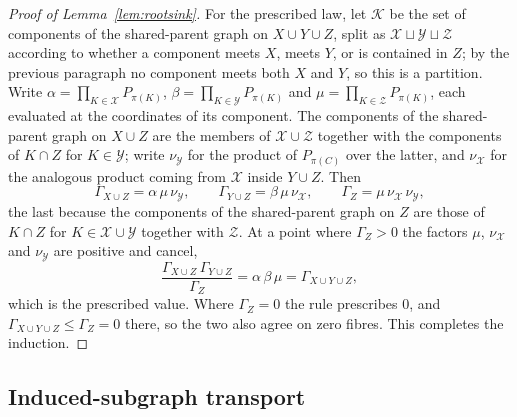 \documentclass[11pt]{article}
\theoremstyle{plain}
\theoremstyle{definition}
\begin{document}
\begin{proof}[Proof of Lemma~\ref{lem:rootsink}]
For the prescribed law, let $\mathcal K$ be the set of components of the shared-parent graph on $X\cup Y\cup Z$, split as $\mathcal X\sqcup\mathcal Y\sqcup\mathcal Z$ according to whether a component meets $X$, meets $Y$, or is contained in $Z$; by the previous paragraph no component meets both $X$ and $Y$, so this is a partition. Write $\alpha=\prod_{K\in\mathcal X}P_{\pi(K)}$, $\beta=\prod_{K\in\mathcal Y}P_{\pi(K)}$ and $\mu=\prod_{K\in\mathcal Z}P_{\pi(K)}$, each evaluated at the coordinates of its component. The components of the shared-parent graph on $X\cup Z$ are the members of $\mathcal X\cup\mathcal Z$ together with the components of $K\cap Z$ for $K\in\mathcal Y$; write $\nu_{\mathcal Y}$ for the product of $P_{\pi(C)}$ over the latter, and $\nu_{\mathcal X}$ for the analogous product coming from $\mathcal X$ inside $Y\cup Z$. Then
\[
\Gamma_{X\cup Z}=\alpha\,\mu\,\nu_{\mathcal Y},\qquad
\Gamma_{Y\cup Z}=\beta\,\mu\,\nu_{\mathcal X},\qquad
\Gamma_{Z}=\mu\,\nu_{\mathcal X}\,\nu_{\mathcal Y},
\]
the last because the components of the shared-parent graph on $Z$ are those of $K\cap Z$ for $K\in\mathcal X\cup\mathcal Y$ together with $\mathcal Z$. At a point where $\Gamma_Z>0$ the factors $\mu$, $\nu_{\mathcal X}$ and $\nu_{\mathcal Y}$ are positive and cancel,
\[
\frac{\Gamma_{X\cup Z}\,\Gamma_{Y\cup Z}}{\Gamma_{Z}}=\alpha\,\beta\,\mu=\Gamma_{X\cup Y\cup Z},
\]
which is the prescribed value. Where $\Gamma_Z=0$ the rule prescribes $0$, and $\Gamma_{X\cup Y\cup Z}\le\Gamma_Z=0$ there, so the two also agree on zero fibres. This completes the induction.
\end{proof}

\subsection{Induced-subgraph transport}\label{app:transport}
\end{document}
